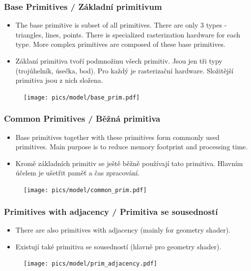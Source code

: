 \begin{frame}
\frametitle{Base Primitives / Základní primitivum}
  \scriptsize

	\begin{itemize}
    \item{The base primitive is subset of all primitives. There are only 3 types - triangles, lines, points. There is specialized rasterization hardware for each type. More complex primitives are composed of these base primitives.}
	\end{itemize}

	\begin{itemize}
    \item{Záklaní primitiva tvoří podmnožinu všech primitiv. Jsou jen tři typy (trojúhelník, úsečka, bod). Pro každý je rasterizační hardware. Složitější primitiva jsou z nich složena.}
	\end{itemize}
	\begin{figure}[h]
		\texttt{[image: pics/model/base\_prim.pdf]}
	\end{figure}
\end{frame}

\begin{frame}
\frametitle{Common Primitives / Běžná primitiva}
  \scriptsize

	\begin{itemize}
    \item{Base primitives together with these primitives form commonly used primitives. Main purpose is to reduce memory footprint and processing time.}
	\end{itemize}

	\begin{itemize}
    \item{Kromě základních primitiv se ještě běžně používají tato primitiva. Hlavním účelem je ušetřit paměť a čas zpracování.}
	\end{itemize}
	\begin{figure}[h]
		\texttt{[image: pics/model/common\_prim.pdf]}
	\end{figure}
\end{frame}

\begin{frame}
\frametitle{Primitives with adjacency / Primitiva se sousedností}
  \scriptsize

	\begin{itemize}
    \item{There are also primitives with adjacency (mainly for geometry shader).}
	\end{itemize}

	\begin{itemize}
    \item{Existují také primitiva se sousedností (hlavně pro geometry shader).}
	\end{itemize}
	\begin{figure}[h]
		\texttt{[image: pics/model/prim\_adjacency.pdf]}
	\end{figure}
\end{frame}

